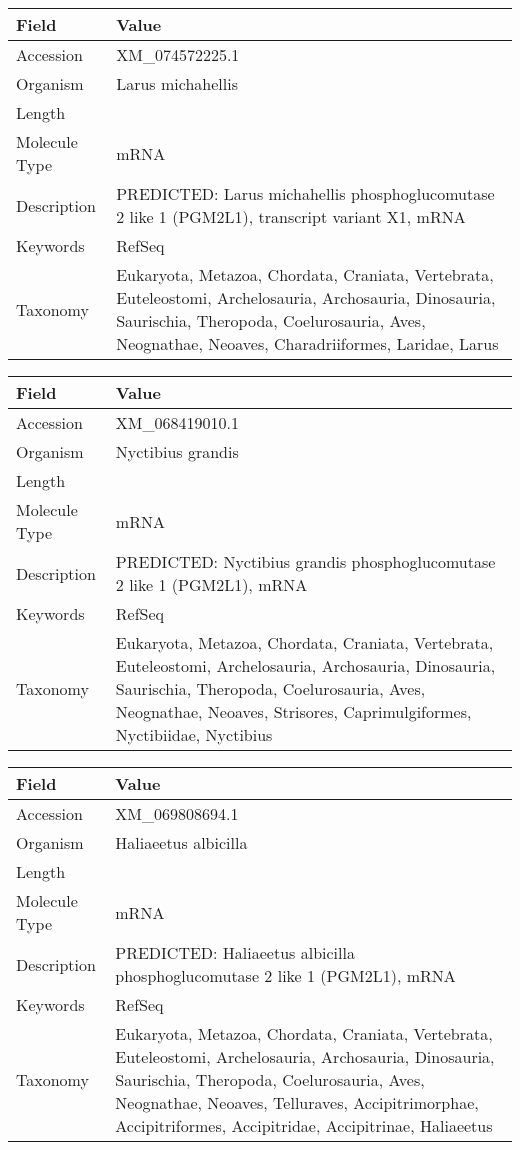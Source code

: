 \documentclass[10pt]{article}
\begin{document}
\vspace{1em}
{\footnotesize
\begin{longtable}{>{\raggedright\arraybackslash}p{4.5cm} >{\raggedright\arraybackslash}p{11.5cm}}
\textbf{Field} & \textbf{Value} \\
\hline
Accession & XM\_074572225.1 \\
Organism & Larus michahellis \\
Length & 6568 \\
Molecule Type & mRNA \\
Description & PREDICTED: Larus michahellis phosphoglucomutase 2 like 1 (PGM2L1), transcript variant X1, mRNA \\
Keywords & RefSeq \\
Taxonomy & Eukaryota, Metazoa, Chordata, Craniata, Vertebrata, Euteleostomi, Archelosauria, Archosauria, Dinosauria, Saurischia, Theropoda, Coelurosauria, Aves, Neognathae, Neoaves, Charadriiformes, Laridae, Larus \\
\end{longtable}
}

\vspace{1em}
{\footnotesize
\begin{longtable}{>{\raggedright\arraybackslash}p{4.5cm} >{\raggedright\arraybackslash}p{11.5cm}}
\textbf{Field} & \textbf{Value} \\
\hline
Accession & XM\_068419010.1 \\
Organism & Nyctibius grandis \\
Length & 6374 \\
Molecule Type & mRNA \\
Description & PREDICTED: Nyctibius grandis phosphoglucomutase 2 like 1 (PGM2L1), mRNA \\
Keywords & RefSeq \\
Taxonomy & Eukaryota, Metazoa, Chordata, Craniata, Vertebrata, Euteleostomi, Archelosauria, Archosauria, Dinosauria, Saurischia, Theropoda, Coelurosauria, Aves, Neognathae, Neoaves, Strisores, Caprimulgiformes, Nyctibiidae, Nyctibius \\
\end{longtable}
}

\vspace{1em}
{\footnotesize
\begin{longtable}{>{\raggedright\arraybackslash}p{4.5cm} >{\raggedright\arraybackslash}p{11.5cm}}
\textbf{Field} & \textbf{Value} \\
\hline
Accession & XM\_069808694.1 \\
Organism & Haliaeetus albicilla \\
Length & 6441 \\
Molecule Type & mRNA \\
Description & PREDICTED: Haliaeetus albicilla phosphoglucomutase 2 like 1 (PGM2L1), mRNA \\
Keywords & RefSeq \\
Taxonomy & Eukaryota, Metazoa, Chordata, Craniata, Vertebrata, Euteleostomi, Archelosauria, Archosauria, Dinosauria, Saurischia, Theropoda, Coelurosauria, Aves, Neognathae, Neoaves, Telluraves, Accipitrimorphae, Accipitriformes, Accipitridae, Accipitrinae, Haliaeetus \\
\end{longtable}
}
\end{document}
